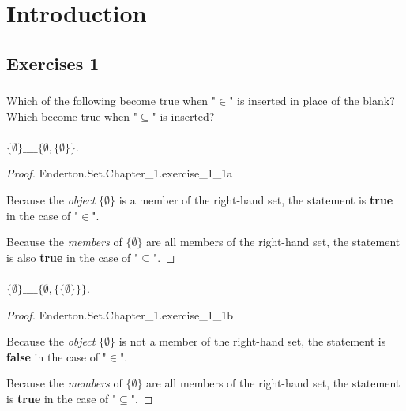 \documentclass{report}
\begin{document}
\endgroup

\chapter{Introduction}%

\section{Exercises 1}%

\subsection{}%

Which of the following become true when "$\in$" is inserted in place of the
  blank?
Which become true when "$\subseteq$" is inserted?

\subsubsection{}%

$\{\emptyset\} \_\_\_\_ \{\emptyset, \{\emptyset\}\}$.

\begin{proof}

    {Enderton.Set.Chapter\_1.exercise\_1\_1a}

  Because the \textit{object} $\{\emptyset\}$ is a member of the right-hand set,
    the statement is \textbf{true} in the case of "$\in$".

  Because the \textit{members} of $\{\emptyset\}$ are all members of the
    right-hand set, the statement is also \textbf{true} in the case of
    "$\subseteq$".

\end{proof}

\subsubsection{}%

$\{\emptyset\} \_\_\_\_ \{\emptyset, \{\{\emptyset\}\}\}$.

\begin{proof}

    {Enderton.Set.Chapter\_1.exercise\_1\_1b}

  Because the \textit{object} $\{\emptyset\}$ is not a member of the right-hand
    set, the statement is \textbf{false} in the case of "$\in$".

  Because the \textit{members} of $\{\emptyset\}$ are all members of the
    right-hand set, the statement is \textbf{true} in the case of "$\subseteq$".

\end{proof}
\end{document}
